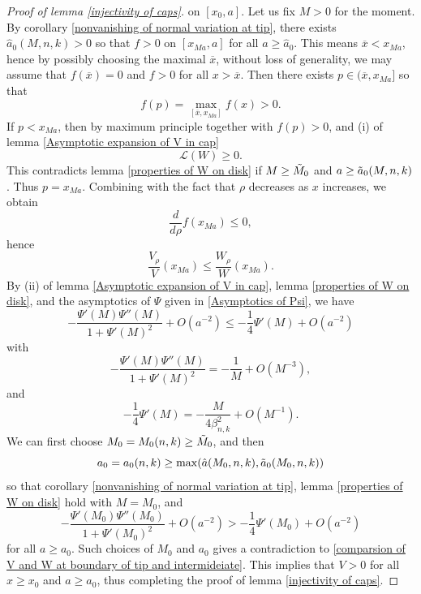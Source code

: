 \documentclass[pdflatex,sn-mathphys-num]{sn-jnl}
\begin{document}
\begin{proof}[Proof of lemma \ref{injectivity of caps}]
on $[x_0, a]$. Let us fix $M > 0$ for the moment. By corollary \ref{nonvanishing of normal variation at tip}, there exists $\hat{a}_0(M, n,k) > 0$ so that $f > 0$ on $[x_{Ma}, a]$ for all $a \geq \hat{a}_0$. This means $\overline{x} < x_{Ma}$, hence by possibly choosing the maximal $\overline{x}$, without loss of generality, we may assume that $f(\overline{x}) = 0$ and $f > 0$ for all $x > \overline{x}$. Then there exists $p \in (\overline{x}, x_{Ma}]$ so that
$$f(p) = \max_{[\overline{x}, x_{Ma}]}f(x) > 0.$$
If $p < x_{Ma}$, then by maximum principle together with $f(p) > 0$, and (i) of lemma \ref{Asymptotic expansion of V in cap}
$$\mathcal{L}(W) \geq 0.$$
This contradicts lemma \ref{properties of W on disk} if $M \geq \Tilde{M}_0$ and $a \geq \Tilde{a}_0(M, n, k)$. Thus $p = x_{Ma}$. Combining with the fact that $\rho$ decreases as $x$ increases, we obtain 
$$\frac{d}{d\rho}f(x_{Ma}) \leq 0,$$
hence
$$\frac{V_{\rho}}{V}(x_{Ma}) \leq \frac{W_{\rho}}{W}(x_{Ma}).$$
By (ii) of lemma \ref{Asymptotic expansion of V in cap}, lemma \ref{properties of W on disk}, and the asymptotics of $\Psi$ given in \eqref{Asymptotics of Psi}, we have
\begin{equation}\label{comparsion of V and W at boundary of tip and intermideiate}
    - \frac{\Psi'(M)\Psi''(M)}{1 + \Psi'(M)^2} + O(a^{-2}) \leq -\frac{1}{4}\Psi'(M) + O(a^{-2})
\end{equation}
with 
$$- \frac{\Psi'(M)\Psi''(M)}{1 + \Psi'(M)^2} = -\frac{1}{M} + O(M^{-3}),$$
and
$$-\frac{1}{4}\Psi'(M) = -\frac{M}{4\beta_{n,k}^2} + O(M^{-1}).$$
We can first choose $M_0 = M_0(n,k) \geq \Tilde{M}_0$, and then 
\begin{equation}
    a_0 = a_0(n,k) \geq \max(\hat{a}(M_0, n,k), \Tilde{a}_0(M_0,n,k))
\end{equation}
so that corollary \ref{nonvanishing of normal variation at tip}, lemma \ref{properties of W on disk} hold with $M = M_0$, and
$$-\frac{\Psi'(M_0)\Psi''(M_0)}{1 + \Psi'(M_0)^2} + O(a^{-2}) > -\frac{1}{4}\Psi'(M_0) + O(a^{-2})$$
for all $a \geq a_0$. Such choices of $M_0$ and $a_0$ gives a contradiction to  \eqref{comparsion of V and W at boundary of tip and intermideiate}. This implies that $V > 0$ for all $x \geq x_0$ and $a \geq a_0$, thus completing the proof of lemma \ref{injectivity of caps}. 
\end{proof}
\end{document}
